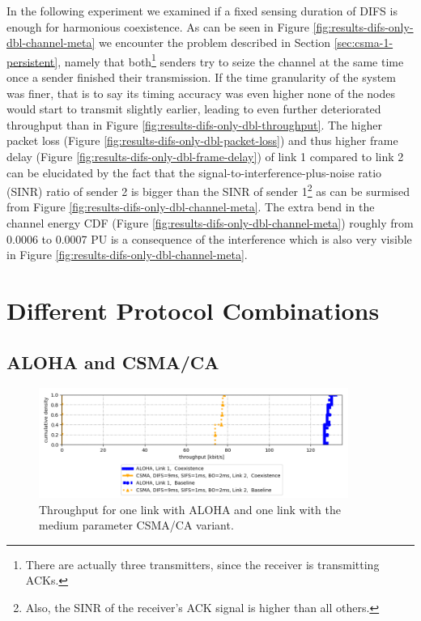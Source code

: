 In the following experiment we examined if a fixed sensing duration of DIFS is enough for harmonious coexistence. As can be seen in Figure \ref{fig:results-difs-only-dbl-channel-meta} we encounter the problem described in Section \ref{sec:csma-1-persistent}, namely that both\footnote{There are actually three transmitters, since the receiver is transmitting ACKs.} senders try to seize the channel at the same time once a sender finished their transmission. If the time granularity of the system was finer, that is to say its timing accuracy was even higher none of the nodes would start to transmit slightly earlier, leading to even further deteriorated throughput than in Figure \ref{fig:results-difs-only-dbl-throughput}. The higher packet loss (Figure \ref{fig:results-difs-only-dbl-packet-loss}) and thus higher frame delay (Figure \ref{fig:results-difs-only-dbl-frame-delay}) of link 1 compared to link 2  can be elucidated by the fact that the signal-to-interference-plus-noise ratio (SINR) ratio of sender 2 is bigger than the SINR of sender 1\footnote{Also, the SINR of the receiver's ACK signal is higher than all others.} as can be surmised from Figure \ref{fig:results-difs-only-dbl-channel-meta}. The extra bend in the channel energy CDF (Figure \ref{fig:results-difs-only-dbl-channel-meta}) roughly from 0.0006 to 0.0007 PU is a consequence of the interference which is also very visible in Figure \ref{fig:results-difs-only-dbl-channel-meta}.

\section{Different Protocol Combinations}
\label{sec:different-protocols}

\subsection{ALOHA and CSMA/CA}
\label{sec:aloha-csma}

\begin{figure}[tb]
	\label{fig:results-aloha-csma-throughput}
	\begin{center}
		\includegraphics[width=0.9\textwidth]{pictures/results/different_combinations/aloha_csma/throughput_cdf}
	\end{center}
	\caption{Throughput for one link with ALOHA and one link with the medium parameter CSMA/CA variant.}
\end{figure}

